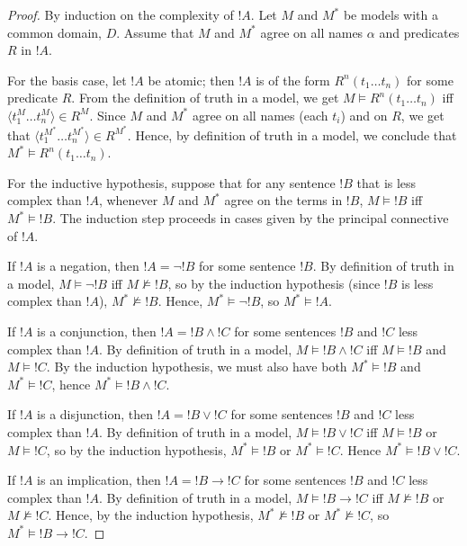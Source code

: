 \documentclass[syntax-and-semantics]{subfiles}
\begin{document}
\begin{proof} By induction on the complexity of $!A$. Let $M$ and $M^*$ be models with a common domain, $D$. Assume that $M$ and $M^*$ agree on all names $\alpha$ and predicates $R$ in $!A$.

For the basis case, let $!A$ be atomic; then $!A$ is of the form $R^n(t_1 \ldots t_n)$ for some predicate $R$. From the definition of truth in a model, we get $M \vDash R^n(t_1 \ldots t_n)$ iff $\langle t_1^M \ldots t_n^M \rangle \in R^M$. Since $M$ and $M^*$ agree on all names (each $t_i$) and on $R$, we get that $\langle t_1^{M^*} \ldots t_n^{M^*} \rangle \in R^{M^*}$. Hence, by definition of truth in a model, we conclude that $M^* \vDash R^n(t_1 \ldots t_n)$. 

For the inductive hypothesis, suppose that for any sentence $!B$ that is less complex than $!A$, whenever $M$ and $M^*$ agree on the terms in $!B$, $M \vDash !B$ iff $M^* \vDash !B$. The induction step proceeds in cases given by the principal connective of $!A$.

If $!A$ is a negation, then $!A = \lnot !B$ for some sentence $!B$. By definition of truth in a model, $M \vDash \lnot !B$ iff $M \nvDash !B$, so by the induction hypothesis (since $!B$ is less complex than $!A$), $M^* \nvDash !B$. Hence, $M^* \vDash \lnot !B$, so $M^* \vDash !A$.

If $!A$ is a conjunction, then $!A = !B \land !C$ for some sentences $!B$ and $!C$ less complex than $!A$. By definition of truth in a model, $M \vDash !B \land !C$ iff $M \vDash !B$ and $M \vDash !C$. By the induction hypothesis, we must also have both $M^* \vDash !B$ and $M^* \vDash !C$, hence $M^* \vDash !B \land !C$.

If $!A$ is a disjunction, then $!A = !B \lor !C$ for some sentences $!B$ and $!C$ less complex than $!A$. By definition of truth in a model, $M \vDash !B \lor !C$ iff $M \vDash !B$ or $M \vDash !C$, so by the induction hypothesis, $M^* \vDash !B$ or $M^* \vDash !C$. Hence $M^* \vDash !B \lor !C$. 

If $!A$ is an implication, then $!A = !B \rightarrow !C$ for some sentences $!B$ and $!C$ less complex than $!A$. By definition of truth in a model, $M \vDash !B \rightarrow !C$ iff $M \nvDash !B$ or $M \nvDash !C$. Hence, by the induction hypothesis, $M^* \nvDash !B$ or $M^* \nvDash !C$, so $M^* \vDash !B \rightarrow !C$.


\end{proof}
\end{document}
